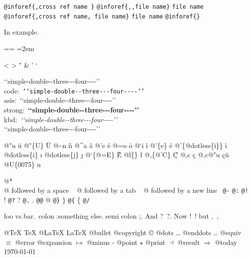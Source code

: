 \documentclass{book}
\makeatletter
\newenvironment{GNUTexinfopreformatted}{%
  \par\obeylines\obeyspaces\frenchspacing
  \parskip=\z@\parindent=\z@}{}
\makeatother
\begin{document}
\texttt{@inforef\{,cross ref name \}} 
\texttt{@inforef\{{,}{,}file name\}} \texttt{file name}
\texttt{@inforef\{,cross ref name,\ file name\}} \texttt{file name}
\texttt{@inforef\{\}} 



In example.
\begin{GNUTexinfopreformatted}
\leftskip=2em\relax\ttfamily%

<
>
"
\&
'
`

{`}{`}simple-double{-}{-}three{-}{-}{-}four{-}{-}{-}-{'}{'}\leavevmode{}\\
code:\ \texttt{{`}{`}simple-double{-}{-}three{-}{-}{-}four{-}{-}{-}-{'}{'}} \leavevmode{}\\
asis:\ {`}{`}simple-double{-}{-}three{-}{-}{-}four{-}{-}{-}-{'}{'} \leavevmode{}\\
strong:\ \textbf{{`}{`}simple-double{-}{-}three{-}{-}{-}four{-}{-}{-}-{'}{'}} \leavevmode{}\\
kbd:\ {\ttfamily\textsl{{`}{`}simple-double{-}{-}three{-}{-}{-}four{-}{-}{-}-{'}{'}}} \leavevmode{}\\

`\hbox{}`simple-double-\hbox{}-three{-}{-}{-}four{-}{-}{-}-'\hbox{}'\leavevmode{}\\

%
%
%
%

@"u \"{u} 
@"\{U\} \"{U} 
@\~{}n \~{n}
@\^{}a \^{a}
@'e \'{e}
@=o \={o}
@`i \`{i}
@'\{e\} \'{e}
@'\{@dotless\{i\}\} \'{\i{}} 
@dotless\{i\} \i{}
@dotless\{j\} \j{}
@`\{@=E\} \`{\={E}} 
@l\{\} \l{}
@,\{@'C\} \c{\'{C}}
@,c \c{c}
@,c@"u \c{c}\"{u} \leavevmode{}\\

@U\{0075\} u

@* \leavevmode{}\\
@ followed by a space
\ {}
@ followed by a tab
\ {}
@ followed by a new line
\ {}\texttt{@-} \-{}
\texttt{@:} \@
\texttt{@!} \@!
\texttt{@?} \@?
\texttt{@.} \@.
\texttt{@@} @
\texttt{@\}} \}
\texttt{@\{} \{
\texttt{@/} 

foo vs.\@ bar.\ 
colon :\@And something else.
semi colon ;\@.
And ?\ ?\@.
Now !\ !\@@
but ,\ ,\@

@TeX \TeX{}
@LaTeX \LaTeX{}
@bullet \textbullet{}
@copyright \copyright{}
@dots \dots{}\@
@enddots \dots{}
@equiv $\equiv{}$
@error 
@expansion $\mapsto{}$
@minus -
@point $\star{}$
@print $\dashv{}$
@result $\Rightarrow{}$
@today \today{}


\end{GNUTexinfopreformatted}
\end{document}
